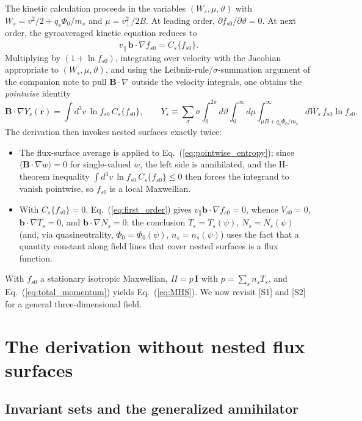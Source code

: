\documentclass[english]{article}
\newcommand{\bB}{\mathbf{B}}
\newcommand{\bb}{\mathbf{b}}
\newcommand{\br}{\mathbf{r}}
\newcommand{\bI}{\mathbf{I}}
\begin{document}
The kinetic calculation proceeds in the variables $(W_s,\mu,\vartheta)$ with
$W_s=v^2/2+q_s\Phi_0/m_s$ and $\mu=v_\perp^2/2B$. At leading order,
$\partial f_{s0}/\partial\vartheta=0$. At next order, the gyroaveraged kinetic equation reduces to
\begin{equation}
v_\parallel\,\bb\cdot\nabla f_{s0}=\overline{C_s\{f_{s0}\}} .
\label{eq:first_order}
\end{equation}
Multiplying by $(1+\ln f_{s0})$, integrating over velocity with the Jacobian appropriate to
$(W_s,\mu,\vartheta)$, and using the Leibniz-rule/$\sigma$-summation argument of the companion note
to pull $\bB\cdot\nabla$ outside the velocity integrals, one obtains the \emph{pointwise} identity
\begin{equation}
\bB\cdot\nabla Y_s(\br)=\int d^3v\,\ln f_{s0}\,C_s\{f_{s0}\},
\qquad
Y_s\equiv\sum_\sigma\sigma\int_0^{2\pi}\!\!d\vartheta\int_0^\infty\!\!d\mu
\int_{\mu B+q_s\Phi_0/m_s}^{\infty}\!\!dW_s\,f_{s0}\ln f_{s0}.
\label{eq:pointwise_entropy}
\end{equation}
The derivation then invokes nested surfaces exactly twice:
\begin{itemize}
\item[{[S1]}] The flux-surface average is applied to Eq.~(\ref{eq:pointwise_entropy}); since
$\langle\bB\cdot\nabla w\rangle=0$ for single-valued $w$, the left side is annihilated, and the
H-theorem inequality $\int d^3v\,\ln f_{s0}\,C_s\{f_{s0}\}\le0$ then forces the integrand to vanish
pointwise, so $f_{s0}$ is a local Maxwellian.
\item[{[S2]}] With $C_s\{f_{s0}\}=0$, Eq.~(\ref{eq:first_order}) gives
$v_\parallel\bb\cdot\nabla f_{s0}=0$, whence $V_{s0}=0$, $\bb\cdot\nabla T_s=0$, and
$\bb\cdot\nabla N_s=0$; the conclusion $T_s=T_s(\psi)$, $N_s=N_s(\psi)$ (and, via quasineutrality,
$\Phi_0=\Phi_0(\psi)$, $n_s=n_s(\psi)$) uses the fact that a quantity constant along field lines
that cover nested surfaces is a flux function.
\end{itemize}
With $f_{s0}$ a stationary isotropic Maxwellian, $\Pi=p\,\bI$ with $p=\sum_s n_sT_s$, and
Eq.~(\ref{eq:total_momentum}) yields Eq.~(\ref{eq:MHS}). We now revisit [S1] and [S2] for a general
three-dimensional field.

\section{The derivation without nested flux surfaces}
\label{sec:nosurfaces}

\subsection{Invariant sets and the generalized annihilator}
\label{sec:annihilator}
\end{document}
